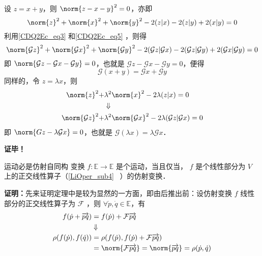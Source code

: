设 $z=x+y$，则 $\norm{z-x-y}^2=0$，亦即
\begin{equation}
\norm{z}^2+\norm{x}^2+\norm{y}^2-2(z|x)-2(z|y)+2(x|y)=0
\end{equation}
利用\autoref{CDQ2Ec_eq3} 和\autoref{CDQ2Ec_eq5} ，则得
\begin{equation}
\norm{\mathcal G z}^2+\norm{\mathcal G x}^2+\norm{\mathcal G y}^2-2(\mathcal G z|\mathcal G x)-2(\mathcal G z|\mathcal G y)+2(\mathcal G x|\mathcal G y)=0
\end{equation}
即 $\norm{\mathcal G z-\mathcal G x-\mathcal G y}=0$，也就是 $\mathcal G z-\mathcal Gx-\mathcal G y=0$，便得
\begin{equation}
\mathcal G(x+y)=\mathcal G x+\mathcal G y
\end{equation}
同样的，令 $z=\lambda x$，则
\begin{equation}
\begin{aligned}
\norm{z}^2+&\lambda^2\norm{x}^2-2\lambda(z|x)=0\\
&\Downarrow\\
\norm{\mathcal G z}^2+&\lambda^2\norm{\mathcal G x}^2-2\lambda(\mathcal G z|\mathcal G x)=0
\end{aligned}
\end{equation}
即 $\norm{G z-\lambda\mathcal G x}=0$，也就是 $\mathcal G (\lambda x)=\lambda\mathcal G x$．

\textbf{证毕！}



\begin{theorem}{运动必是仿射自同构}\label{CDQ2Ec_the1}
变换 $f:\mathbb E\rightarrow\mathbb E$ 是个运动，当且仅当， $f$ 是个线性部分为 $V$ 上的正交线性算子（\autoref{LiOper_sub4}~ ）的仿射变换．
\end{theorem}
\textbf{证明：}先来证明定理中是较为显然的一方面，即由后推出前：设仿射变换 $f$ 线性部分的正交线性算子为 $\mathcal F$ ，则 $\forall \dot p,\dot q\in\mathbb E$，有
\begin{equation}
\begin{aligned}
f(\dot p+\overrightarrow{pq})&=f(\dot p)+\mathcal F\overrightarrow{pq}\\
&\Downarrow\\
\rho(f(\dot p),f(\dot q))&=\rho(f(\dot p),f(\dot p)+\mathcal F\overrightarrow{pq})\\
&=\norm{\mathcal F\overrightarrow{pq}}=\norm{\overrightarrow{pq}}=\rho(\dot p,\dot q)
\end{aligned}
\end{equation}

